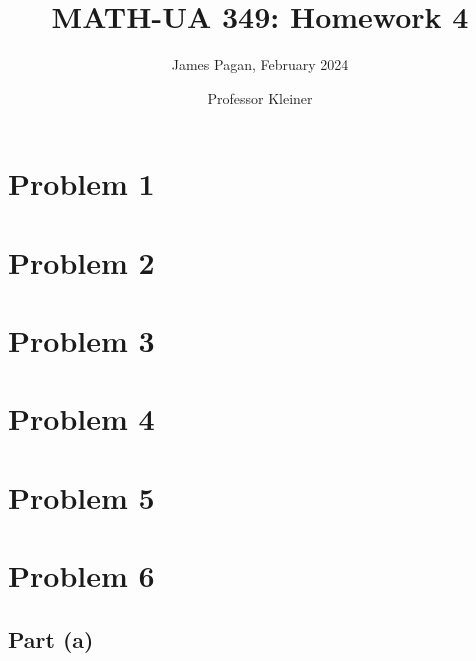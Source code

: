 \documentclass[11pt]{article}
\title{MATH-UA 349: Homework 4}
\author{James Pagan, February 2024}
\date{Professor Kleiner}
\begin{document}
\maketitle
\tableofcontents
\newpage


\section{Problem 1}


\section{Problem 2}


\section{Problem 3}


\section{Problem 4}


\section{Problem 5}


\section{Problem 6}


\subsection{Part (a)}
\end{document}
